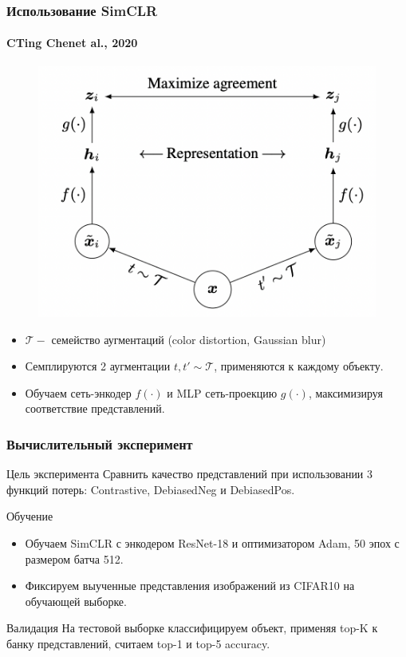 \documentclass[
	11pt, %
	t, %
        russian
]{beamer}
\begin{document}
\begin{frame}
	\frametitle{Использование SimCLR}
	\framesubtitle{CTing Chenet al., 2020} %

\begin{figure}
    \includegraphics[width=0.5\linewidth]{Images/simclr.png}
\end{figure}

\scriptsize
\begin{itemize}
    \item $\mathcal{T} -$ семейство аугментаций (color distortion, Gaussian blur) 
    \item Семплируются 2 аугментации $t, t' \sim \mathcal{T}$, применяются к каждому объекту.
    \item Обучаем сеть-энкодер $f(\cdot)$ и MLP сеть-проекцию $g(\cdot)$, максимизируя соответствие представлений.
\end{itemize}
\end{frame}

\begin{frame}
	\frametitle{Вычислительный эксперимент}
\scriptsize

\begin{block}{ \small Цель эксперимента}
Сравнить качество представлений при использовании 3 функций потерь: Contrastive, DebiasedNeg и DebiasedPos. 
\end{block}

\begin{block}{ \small Обучение}
\begin{itemize}
    \item Обучаем SimCLR с энкодером ResNet-18 и оптимизатором Adam, 50 эпох с размером батча 512.
    \item Фиксируем выученные представления изображений из CIFAR10 на обучающей выборке.
\end{itemize}
\end{block}

\begin{block}{ \small Валидация}
На тестовой выборке классифицируем объект, применяя top-K к банку представлений, считаем top-1 и top-5 accuracy.
\end{block}

\end{frame}
\end{document}
